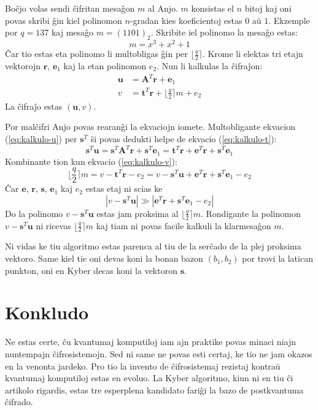 \documentclass[utf8]{scrartcl}
\begin{document}
Boĉjo volas sendi ĉifritan mesaĝon $m$ al Anjo. $m$ konsistas el $n$ bitoj kaj
oni povas skribi ĝin kiel polinomon $n$-gradan kies koeficientoj estas $0$ aŭ
$1$. Ekzemple por $q = 137$ kaj mesaĝo $m = (1101)_2$. Skribite iel polinomo la
mesaĝo estas:
\[
   m = x^3 + x^2 + 1
\]
Ĉar tio estas eta polinomo li multobligas ĝin per
$\bigl\lfloor\frac{q}{2}\bigr\rceil$. Krome li elektas tri etajn vektorojn
$\mathbf{r}$, $\mathbf{e}_1$ kaj la etan polinomon $e_2$. Nun li kalkulas la
ĉifraĵon:
\begin{align}
  \mathbf{u} &= \mathbf{A}^T \mathbf{r} + \mathbf{e}_1 \label{eq:kalkulo-u}\\
  v &= \mathbf{t}^T\mathbf{r} + \bigl\lfloor\frac{q}{2}\bigr\rceil m + e_2 \label{eq:kalkulo-v}
\end{align}
La ĉifraĵo estas $(\mathbf{u}, v)$.

Por malĉifri Anjo povas rearanĝi la ekvaciojn iomete. Multobligante
ekvacion (\ref{eq:kalkulo-u}) per $\mathbf{s}^T$ ŝi povas dedukti helpe de
ekvacio (\ref{eq:kalkulo-t}):
\begin{equation}
  \label{eq:malĉifrado-paŝo}
  \mathbf{s}^T\mathbf{u} =
  \mathbf{s}^T\mathbf{A}^T\mathbf{r} + \mathbf{s}^T\mathbf{e}_1 =
  \mathbf{t}^T\mathbf{r} + \mathbf{e}^T\mathbf{r} + \mathbf{s}^T\mathbf{e}_1
\end{equation}
Kombinante tion kun ekvacio (\ref{eq:kalkulo-v}):
\begin{equation}
  \label{eq:malĉifrado}
  \bigl\lfloor\frac{q}{2}\bigr\rceil m = v - \mathbf{t}^T\mathbf{r} - e_2 =
  v - \mathbf{s}^T\mathbf{u} + \mathbf{e}^T\mathbf{r} + \mathbf{s}^T\mathbf{e}_1 - e_2
\end{equation}
Ĉar $\mathbf{e}$, $\mathbf{r}$, $\mathbf{s}$, $\mathbf{e}_1$ kaj $e_2$ estas etaj ni scias ke
\[
  \left|v - \mathbf{s}^T\mathbf{u} \right| \gg \left|\mathbf{e}^T\mathbf{r} + \mathbf{s}^T\mathbf{e}_1 - e_2\right|
\]
Do la polinomo $v - \mathbf{s}^T\mathbf{u}$ estas jam proksima al
$\bigl\lfloor\frac{q}{2}\bigr\rceil m$. Rondigante la polinomon
$v - \mathbf{s}^T\mathbf{u}$ ni ricevas $\bigl\lfloor\frac{q}{2}\bigr\rceil m$
kaj tiam ni povas facile kalkuli la klarmesaĝon $m$.

Ni vidas ke tiu algoritmo estas parenca al tiu de la serĉado de la plej
proksima vektoro. Same kiel tie oni devas koni la bonan bazon $(b_1, b_2)$ por
trovi la latican punkton, oni en Kyber decas koni la vektoron $\mathbf{s}$.

\section{Konkludo}

Ne estas certe, ĉu kvantumaj komputiloj iam ajn praktike povas minaci niajn
nuntempajn ĉifrosistemojn. Sed ni same ne povas esti certaj, ke tio ne jam
okazos en la venonta jardeko. Pro tio la invento de ĉifrosistemaj rezistaj
kontraŭ kvantumaj komputiloj estas en evoluo. La Kyber algoritmo, kiun ni en
tiu ĉi artikolo rigardis, estas tre esperplena kandidato fariĝi la bazo de
postkvantuma ĉifrado.
\end{document}
